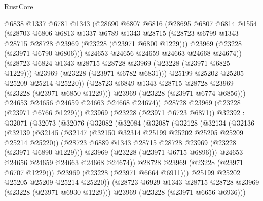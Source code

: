 \begin{lexlean}{RustCore}
\begin{coremodule}
                  @6838
                  @1337
                  @6781
                  @1343
                  (@28690
                    @6807
                    @6816
                    (@28695
                      @6807
                      @6814
                      @1554
                      (@28703
                        @6806
                        @6813
                        @1337
                        @6789
                        @1343
                        @28715
                        (@28723 @6799 @1343 @28715 @28728 @23969 (@23228 (@23971 @6800 @1229)))
                        @23969
                        (@23228 (@23971 @6790 @6806)))
                      @24653
                      @24656
                      @24659
                      @24663
                      @24668
                      @24674))
                  (@28723 @6824 @1343 @28715 @28728 @23969 (@23228 (@23971 @6825 @1229)))
                  @23969
                  (@23228 (@23971 @6782 @6831)))
                @25199
                @25202
                @25205
                @25209
                @25214
                @25220))
            (@28723 @6849 @1343 @28715 @28728 @23969 (@23228 (@23971 @6850 @1229)))
            @23969
            (@23228 (@23971 @6774 @6856)))
          @24653
          @24656
          @24659
          @24663
          @24668
          @24674))
      @28728
      @23969
      (@23228 (@23971 @6766 @1229)))
    @23969
    (@23228 (@23971 @6723 @6871))
@32392 := @32071
    (@32073
      (@32076
        (@32082
          (@32084
            (@32087
              (@32128
                (@32134
                  (@32136
                    (@32139
                      (@32145
                        (@32147 (@32150 @32314 @25199 @25202 @25205 @25209 @25214 @25220))
                        (@28723 @6889 @1343 @28715 @28728 @23969 (@23228 (@23971 @6890 @1229)))
                        @23969
                        (@23228 (@23971 @6715 @6896)))
                      @24653
                      @24656
                      @24659
                      @24663
                      @24668
                      @24674))
                  @28728
                  @23969
                  (@23228 (@23971 @6707 @1229)))
                @23969
                (@23228 (@23971 @6664 @6911)))
              @25199
              @25202
              @25205
              @25209
              @25214
              @25220))
          (@28723 @6929 @1343 @28715 @28728 @23969 (@23228 (@23971 @6930 @1229)))
          @23969
          (@23228 (@23971 @6656 @6936)))

\end{coremodule}
\end{lexlean}
